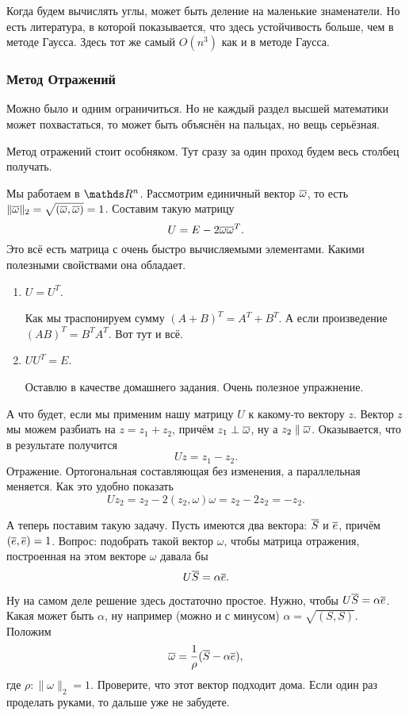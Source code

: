 Когда будем вычислять углы, может быть деление на маленькие знаменатели. Но есть литература, в которой показывается, что здесь устойчивость больше, чем в методе Гаусса.
Здесь тот же самый $O(n^3)$ как и в методе Гаусса.

\subsubsection{Метод Отражений}
Можно было и одним ограничиться. Но не каждый раздел высшей математики может похвастаться, то может быть объяснён на пальцах, но вещь серьёзная.

Метод отражений стоит особняком. Тут сразу за один проход будем весь столбец получать.

Мы работаем в $\R^n$. Рассмотрим единичный вектор $\overline{\omega}$, то есть $\|\overline{\omega}\|_2 = \sqrt{(\overline{\omega},\overline{\omega})} = 1$. Составим такую матрицу
\[
  U = E - 2\overline{\omega} \overline{\omega}^T.
\]
Это всё есть матрица с очень быстро вычисляемыми элементами. Какими полезными свойствами она обладает.
\begin{enumerate}
\item $U = U^T$.

Как мы траспонируем сумму $(A+B)^T = A^T + B^T$. А если произведение $(AB)^T = B^TA^T$. Вот тут и всё.
\item $UU^T = E$.

Оставлю в качестве домашнего задания. Очень полезное упражнение.
\end{enumerate}
А что будет, если мы применим нашу матрицу $U$ к какому-то вектору $z$. Вектор $z$ мы можем разбиать на $z= z_1+z_2$, причём $z_1\perp \overline{\omega}$, ну а $z_2\parallel \overline{\omega}$.
Оказывается, что в результате получится
\[
  Uz = z_1 -  z_2.
\]
Отражение. Ортогональная составляющая без изменения, а параллельная меняется. Как это удобно показать
\[
  Uz_2 = z_2 - 2(z_2,\omega)\omega = z_2-2z_2 = -z_2.
\]

А теперь поставим такую задачу. Пусть имеются два вектора: $\overline{S}$ и $\overline{e}$, причём $(\overline{e},\overline{e})=1$. Вопрос: подобрать такой вектор $\omega$, чтобы матрица отражения, построенная на этом векторе $\omega$ давала бы
\[
 U\overline{S} = \alpha \overline{e}.
\]

Ну на самом деле решение здесь достаточно простое. Нужно, чтобы $U\overline{S} = \alpha \overline{e}$. Какая может быть $\alpha$, ну например (можно и с минусом) $\alpha = \sqrt{(S,S)}$. Положим
\[
  \overline{\omega} = \frac1\rho (\overline{S} - \alpha \overline{e}),
\]
где $\rho\colon \|\omega\|_2 = 1$. Проверите, что этот вектор подходит дома. Если один раз проделать руками, то дальше уже не забудете.

